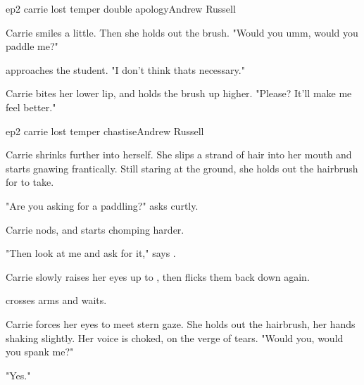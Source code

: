 \documentclass{book}
\begin{document}
\begin{childnode}{ep2 carrie lost temper double apology}{Andrew Russell}

    Carrie smiles a little. Then she holds out the brush. "Would you umm, would you paddle me?"

    \name{} approaches the student. "I don't think thats necessary."

    Carrie bites her lower lip, and holds the brush up higher. "Please? It'll make me feel better."



\end{childnode}

\begin{childnode}{ep2 carrie lost temper chastise}{Andrew Russell}

    Carrie shrinks further into herself. She slips a strand of hair into her mouth and starts gnawing frantically. Still staring at the ground, she holds out the hairbrush for \name{} to take.

    "Are you asking for a paddling?" asks \name{} curtly.

    Carrie nods, and starts chomping harder.

    "Then look at me and ask for it," says \name{}.

    Carrie slowly raises her eyes up to \names{}, then flicks them back down again.

    \name{} crosses \hisher{} arms and waits.

    Carrie forces her eyes to meet \names{} stern gaze. She holds out the hairbrush, her hands shaking slightly. Her voice is choked, on the verge of tears. "Would you, would you spank me?"

    "Yes."


\end{childnode}
\end{document}
